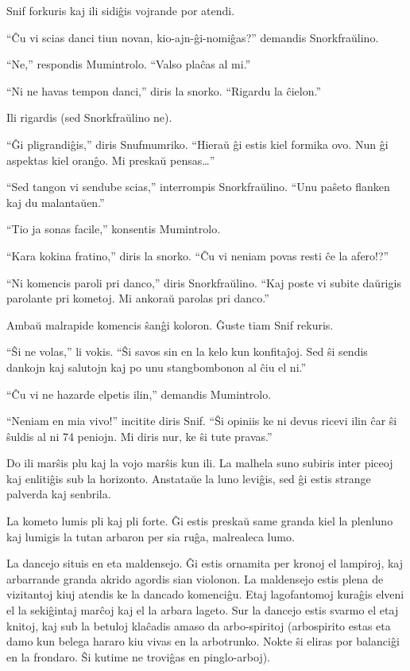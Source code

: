 Snif forkuris kaj ili sidiĝis vojrande por atendi.

``Ĉu vi scias danci tiun novan, kio-ajn-ĝi-nomiĝas?'' demandis Snorkfraŭlino.

``Ne,'' respondis Mumintrolo. ``Valso plaĉas al mi.''

``Ni ne havas tempon danci,'' diris la snorko. ``Rigardu la ĉielon.''

Ili rigardis (sed Snorkfraŭlino ne).

``Ĝi pligrandiĝis,'' diris Snufmumriko. ``Hieraŭ ĝi estis kiel formika ovo. Nun ĝi aspektas kiel oranĝo. Mi preskaŭ pensas{\ldots}''

``Sed tangon vi sendube scias,'' interrompis Snorkfraŭlino. ``Unu paŝeto flanken kaj du malantaŭen.''

``Tio ja sonas facile,'' konsentis Mumintrolo.

``Kara kokina fratino,'' diris la snorko. ``Ĉu vi neniam povas resti ĉe la afero!?''

``Ni komencis paroli pri danco,'' diris Snorkfraŭlino. ``Kaj poste vi subite daŭrigis parolante pri kometoj. Mi ankoraŭ parolas pri danco.''

Ambaŭ malrapide komencis ŝanĝi koloron. Ĝuste tiam Snif rekuris.

``Ŝi ne volas,'' li vokis. ``Ŝi savos sin en la kelo kun konfitaĵoj. Sed ŝi sendis dankojn kaj salutojn kaj po unu stangbombonon al ĉiu el ni.''

``Ĉu vi ne hazarde elpetis ilin,'' demandis Mumintrolo.

``Neniam en mia vivo!'' incitite diris Snif. ``Ŝi opiniis ke ni devus ricevi ilin ĉar ŝi ŝuldis al ni 74 peniojn. Mi diris nur, ke ŝi tute pravas.''

Do ili marŝis plu kaj la vojo marŝis kun ili. La malhela suno subiris inter piceoj kaj enlitiĝis sub la horizonto. Anstataŭe la luno leviĝis, sed ĝi estis strange palverda kaj senbrila.

La kometo lumis pli kaj pli forte. Ĝi estis preskaŭ same granda kiel la plenluno kaj lumigis la tutan arbaron per sia ruĝa, malrealeca lumo.

La dancejo situis en eta maldensejo. Ĝi estis ornamita per kronoj el lampiroj, kaj arbarrande granda akrido agordis sian violonon. La maldensejo estis plena de vizitantoj kiuj atendis ke la dancado komenciĝu. Etaj lagofantomoj kuraĝis elveni el la sekiĝintaj marĉoj kaj el la arbara lageto. Sur la dancejo estis svarmo el etaj knitoj, kaj sub la betuloj klaĉadis amaso da arbo-spiritoj (arbospirito estas eta damo kun belega hararo kiu vivas en la arbotrunko. Nokte ŝi eliras por balanciĝi en la frondaro. Ŝi kutime ne troviĝas en pinglo-arboj).

